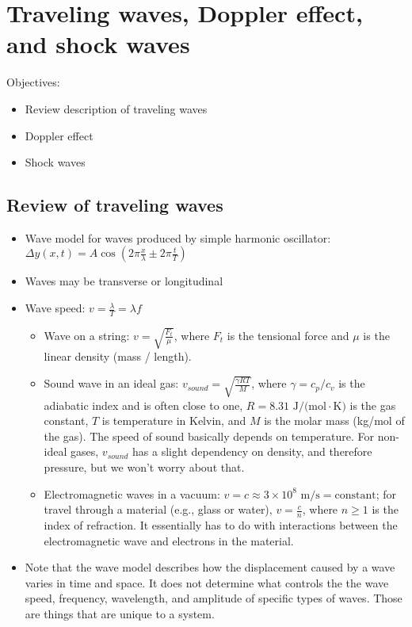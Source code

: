 \section{Traveling waves, Doppler effect, and shock waves}
Objectives:
\begin{itemize}
\item Review description of traveling waves
\item Doppler effect
\item Shock waves
\end{itemize}

\subsection{Review of traveling waves}
\begin{itemize}
\item Wave model for waves produced by simple harmonic oscillator: $\Delta{y}(x,t)=A\cos\left(2\pi\frac{x}{\lambda}\pm 2\pi\frac{t}{T}\right)$
\item Waves may be transverse or longitudinal
\item Wave speed: $v=\frac{\lambda}{T}=\lambda f$
  \begin{itemize}
  \item Wave on a string: $v=\sqrt{\frac{F_t}{\mu}}$, where $F_t$ is the tensional force and $\mu$ is the linear density (mass / length).
  \item Sound wave in an ideal gas: $v_{sound}=\sqrt{\frac{\gamma RT}{M}}$,  where $\gamma=c_p/c_v$ is the adiabatic index and is often close to one, $R=8.31\mbox{ J/(mol}\cdot\mbox{K)}$ is the gas constant, $T$ is temperature in Kelvin, and $M$ is the molar mass (kg/mol of the gas). The speed of sound basically depends on temperature. For non-ideal gases, $v_{sound}$ has a slight dependency on density, and therefore pressure, but we won't worry about that.
  \item Electromagnetic waves in a vacuum: $v=c\approx 3\times 10^8\mbox{ m/s}=\mbox{constant}$; for travel through a material (e.g., glass or water), $v=\frac{c}{n}$, where $n\geq 1$ is the index of refraction. It essentially has to do with interactions between the electromagnetic wave and electrons in the material.
  \end{itemize}  
\item Note that the wave model describes how the displacement caused by a wave varies in time and space. It does not determine what controls the the wave speed, frequency, wavelength, and amplitude of specific types of waves. Those are things that are unique to a system.
\end{itemize}

